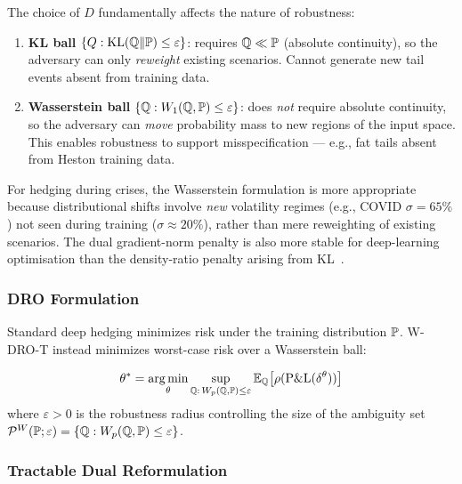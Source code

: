 \begin{remark}
The choice of $D$ fundamentally affects the nature of robustness:
\begin{enumerate}[noitemsep]
    \item \textbf{KL ball} $\{Q : \mathrm{KL}(\mathbb{Q}\|\mathbb{P}) \le \varepsilon\}$: requires $\mathbb{Q} \ll \mathbb{P}$ (absolute continuity), so the adversary can only \emph{reweight} existing scenarios.  Cannot generate new tail events absent from training data.
    \item \textbf{Wasserstein ball} $\{\mathbb{Q} : W_1(\mathbb{Q},\mathbb{P}) \le \varepsilon\}$: does \emph{not} require absolute continuity, so the adversary can \emph{move} probability mass to new regions of the input space.  This enables robustness to support misspecification --- e.g., fat tails absent from Heston training data.
\end{enumerate}
For hedging during crises, the Wasserstein formulation is more appropriate because distributional shifts involve \emph{new} volatility regimes (e.g., COVID $\sigma = 65\%$) not seen during training ($\sigma \approx 20\%$), rather than mere reweighting of existing scenarios.  The dual gradient-norm penalty is also more stable for deep-learning optimisation than the density-ratio penalty arising from KL~\citep{esfahani2018data}.
\end{remark}

\subsubsection{DRO Formulation}

Standard deep hedging minimizes risk under the training distribution $\mathbb{P}$. W-DRO-T instead minimizes worst-case risk over a Wasserstein ball:

\begin{definition}
\begin{equation}
    \theta^* = \operatorname*{arg\,min}_\theta \sup_{\mathbb{Q}:\, W_p(\mathbb{Q}, \mathbb{P}) \leq \varepsilon} \mathbb{E}_{\mathbb{Q}}\bigl[\rho(\mathrm{P\&L}(\delta^\theta))\bigr]
    \label{eq:dro_obj}
\end{equation}
where $\varepsilon > 0$ is the robustness radius controlling the size of the ambiguity set $\mathcal{P}^W(\mathbb{P}; \varepsilon) = \{\mathbb{Q} : W_p(\mathbb{Q}, \mathbb{P}) \leq \varepsilon\}$.
\end{definition}

\subsubsection{Tractable Dual Reformulation}

